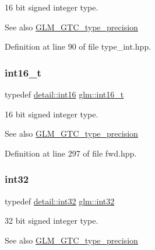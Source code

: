 16 bit signed integer type. \begin{DoxySeeAlso}{See also}
\hyperlink{group__gtc__type__precision}{G\+L\+M\+\_\+\+G\+T\+C\+\_\+type\+\_\+precision} 
\end{DoxySeeAlso}


Definition at line 90 of file type\+\_\+int.\+hpp.

\mbox{\label{group__gtc__type__precision_gaf89ee61e0d34aa4a462104b7ae7f2da6}} 
\subsubsection{\texorpdfstring{int16\+\_\+t}{int16\_t}}
{\footnotesize\ttfamily typedef \hyperlink{namespaceglm_1_1detail_a375938874ca4f0a0982ec6373b56117b}{detail\+::int16} \hyperlink{group__gtc__type__precision_gaf89ee61e0d34aa4a462104b7ae7f2da6}{glm\+::int16\+\_\+t}}

16 bit signed integer type. \begin{DoxySeeAlso}{See also}
\hyperlink{group__gtc__type__precision}{G\+L\+M\+\_\+\+G\+T\+C\+\_\+type\+\_\+precision} 
\end{DoxySeeAlso}


Definition at line 297 of file fwd.\+hpp.

\mbox{\label{group__gtc__type__precision_ga632d8b25f6b61659f39ea4321fab92a4}} 
\subsubsection{\texorpdfstring{int32}{int32}}
{\footnotesize\ttfamily typedef \hyperlink{namespaceglm_1_1detail_a9f85b4efeca416cdcec2fd08939a2e17}{detail\+::int32} \hyperlink{group__gtc__type__precision_ga632d8b25f6b61659f39ea4321fab92a4}{glm\+::int32}}

32 bit signed integer type. \begin{DoxySeeAlso}{See also}
\hyperlink{group__gtc__type__precision}{G\+L\+M\+\_\+\+G\+T\+C\+\_\+type\+\_\+precision} 
\end{DoxySeeAlso}



